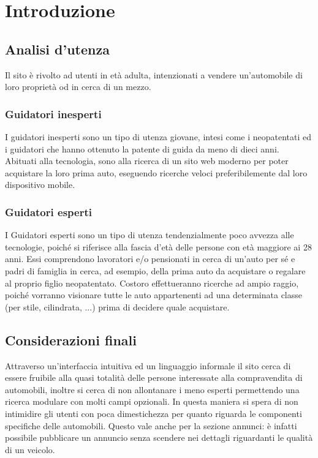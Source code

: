 \section{Introduzione}
	\subsection{Analisi d'utenza}
	\par Il sito è rivolto ad utenti in età adulta, intenzionati a vendere un’automobile di loro proprietà od in cerca di un mezzo.
	\subsubsection{Guidatori inesperti}
	\par I guidatori inesperti sono un tipo di utenza giovane, intesi come i neopatentati ed i guidatori che hanno ottenuto la patente di guida da meno di dieci anni. Abituati alla tecnologia, sono alla ricerca di un sito web moderno per poter acquistare la loro prima auto, eseguendo ricerche veloci preferibilemente dal loro dispositivo mobile.
	\subsubsection{Guidatori esperti}
	\par I Guidatori esperti sono un tipo di utenza tendenzialmente poco avvezza alle tecnologie, poiché si riferisce alla fascia d'età delle persone con età maggiore ai 28 anni. Essi comprendono lavoratori e/o pensionati in cerca di un'auto per sé e padri di famiglia in cerca, ad esempio, della prima auto da acquistare o regalare al proprio figlio neopatentato. Costoro effettueranno ricerche ad ampio raggio, poiché vorranno visionare tutte le auto appartenenti ad una determinata classe (per stile, cilindrata, ...) prima di decidere quale acquistare.
	\subsection{Considerazioni finali}
	\par Attraverso un’interfaccia intuitiva ed un linguaggio informale il sito cerca di essere fruibile alla quasi totalità delle persone interessate alla compravendita di automobili, inoltre si cerca di non allontanare i meno esperti permettendo una ricerca modulare con molti campi opzionali. In questa maniera si spera di non intimidire gli utenti con poca dimestichezza per quanto riguarda le componenti specifiche delle automobili. Questo vale anche per la sezione annunci: è infatti possibile pubblicare un annuncio senza scendere nei dettagli riguardanti le qualità di un veicolo.